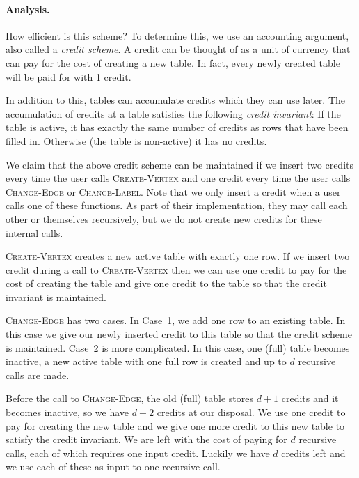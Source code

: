 \paragraph{Analysis.}

How efficient is this scheme?  To determine this, we use an accounting
argument, also called a \emph{credit scheme}.  A credit can be thought
of as a unit of currency that can pay for the cost of creating a new
table.  In fact, every newly created table will be paid for with 1
credit.  

In addition to this, tables can accumulate credits which they can use
later.  The accumulation of credits at a table satisfies the
following \emph{credit invariant}: If the table is active, it has
exactly the same number of credits as rows that have been filled in.
Otherwise (the table is non-active) it has no credits.

We claim that the above credit scheme can be maintained if we insert
two credits every time the user calls \textsc{Create-Vertex} and one
credit every time the user calls \textsc{Change-Edge} or
\textsc{Change-Label}.  Note that we only insert a credit when a user
calls one of these functions.  As part of their implementation, they
may call each other or themselves recursively, but we do not create
new credits for these internal calls.

\textsc{Create-Vertex} creates a new active table with exactly one
row.  If we insert two credit during a call to \textsc{Create-Vertex}
then we can use one credit to pay for the cost of creating the table
and give one credit to the table so that the credit invariant is
maintained.

\textsc{Change-Edge} has two cases.  In Case~1, we add one row to an
existing table.  In this case we give our newly inserted credit to
this table so that the credit scheme is maintained.  Case~2 is more
complicated.  In this case, one (full) table becomes inactive, a new
active table with one full row is created and up to $d$ recursive
calls are made.

Before the call to \textsc{Change-Edge}, the old (full) table stores
$d+1$ credits and it becomes inactive, so we have $d+2$ credits at our
disposal.  We use one credit to pay for creating the new table and we
give one more credit to this new table to satisfy the credit
invariant.  We are left with the cost of paying for $d$ recursive
calls, each of which requires one input credit.  Luckily we have $d$
credits left and we use each of these as input to one recursive call.

